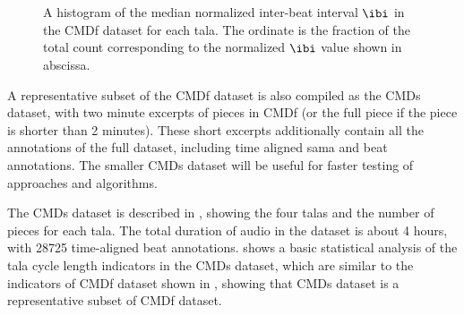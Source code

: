 \begin{figure}
\begin{center}
 \hspace{0.5cm} 
 \\ 
 \hspace{0.5cm} 
 \\ 
\caption[Histogram of median normalized $\protect\ibi$ in the \acrshort{CMDf} dataset]{A histogram of the median normalized inter-beat interval $\protect\ibi$ in the \acrshort{CMDf} dataset for each \gls{tala}. The ordinate is the fraction of the total count corresponding to the normalized $\ibi$ value shown in abscissa.}\label{fig:dstats:CMDf:IAInorm}
\end{center}
\end{figure}

A representative subset of the \acrshort{CMDf} dataset is also compiled as the \acrshort{CMDs} dataset, with two minute excerpts of pieces in \acrshort{CMDf} (or the full piece if the piece is shorter than 2 minutes). These short excerpts additionally contain all the annotations of the full dataset, including time aligned \gls{sama} and beat annotations. The smaller \acrshort{CMDs} dataset will be useful for faster testing of approaches and algorithms. 

The \acrshort{CMDs} dataset is described in , showing the four \glspl{tala} and the number of pieces for each \gls{tala}. The total duration of audio in the dataset is about 4 hours, with 28725 time-aligned beat annotations.  shows a basic statistical analysis of the \gls{tala} cycle length indicators in the \acrshort{CMDs} dataset, which are similar to the indicators of \acrshort{CMDf} dataset shown in , showing that \acrshort{CMDs} dataset is a representative subset of \acrshort{CMDf} dataset. 

